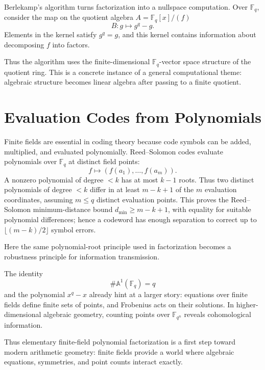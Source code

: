 Berlekamp's algorithm turns factorization into a nullspace computation.  Over \(\mathbb F_q\), consider the map on the quotient algebra \(A=\mathbb F_q[x]/(f)\)
\[
  B:g\mapsto g^q-g.
\]
Elements in the kernel satisfy \(g^q=g\), and this kernel contains information about decomposing \(f\) into factors.

Thus the algorithm uses the finite-dimensional \(\mathbb F_q\)-vector space structure of the quotient ring.  This is a concrete instance of a general computational theme: algebraic structure becomes linear algebra after passing to a finite quotient.

\section{Evaluation Codes from Polynomials}

Finite fields are essential in coding theory because code symbols can be added, multiplied, and evaluated polynomially.  Reed--Solomon codes evaluate polynomials over \(\mathbb F_q\) at distinct field points:
\[
  f\longmapsto (f(a_1),\ldots,f(a_m)).
\]
A nonzero polynomial of degree \(<k\) has at most \(k-1\) roots. Thus two distinct polynomials of degree \(<k\) differ in at least \(m-k+1\) of the \(m\) evaluation coordinates, assuming \(m\le q\) distinct evaluation points. This proves the Reed--Solomon minimum-distance bound \(d_{\min}\ge m-k+1\), with equality for suitable polynomial differences; hence a codeword has enough separation to correct up to \(\lfloor(m-k)/2\rfloor\) symbol errors.

Here the same polynomial-root principle used in factorization becomes a robustness principle for information transmission.

The identity
\[
  \#\mathbb A^1(\mathbb F_q)=q
\]
and the polynomial \(x^q-x\) already hint at a larger story: equations over finite fields define finite sets of points, and Frobenius acts on their solutions.  In higher-dimensional algebraic geometry, counting points over \(\mathbb F_{q^n}\) reveals cohomological information.

Thus elementary finite-field polynomial factorization is a first step toward modern arithmetic geometry: finite fields provide a world where algebraic equations, symmetries, and point counts interact exactly.
